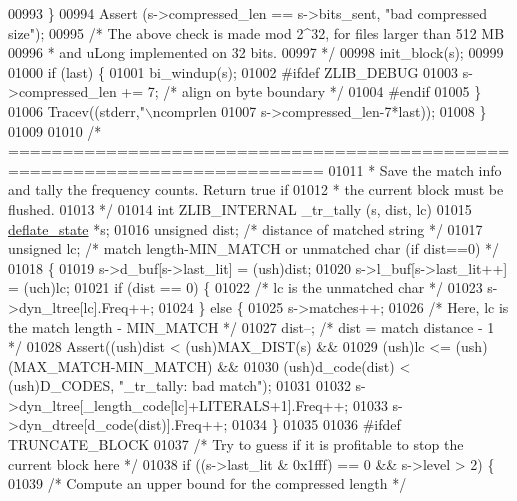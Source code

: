 \begin{DoxyCode}
{{{{{{{{{{{{{{{{{{{{{00993     \}
00994     Assert (s->compressed\_len == s->bits\_sent, \textcolor{stringliteral}{"bad compressed size"});
00995     \textcolor{comment}{/* The above check is made mod 2^32, for files larger than 512 MB}
00996 \textcolor{comment}{     * and uLong implemented on 32 bits.}
00997 \textcolor{comment}{     */}
00998     init\_block(s);
00999 
01000     \textcolor{keywordflow}{if} (last) \{
01001         bi\_windup(s);
01002 \textcolor{preprocessor}{#ifdef ZLIB\_DEBUG}
01003         s->compressed\_len += 7;  \textcolor{comment}{/* align on byte boundary */}
01004 \textcolor{preprocessor}{#endif}
01005     \}
01006     Tracev((stderr,\textcolor{stringliteral}{"\(\backslash\)ncomprlen %
01007            s->compressed\_len-7*last));
01008 \}
01009 
01010 \textcolor{comment}{/* ===========================================================================}
01011 \textcolor{comment}{ * Save the match info and tally the frequency counts. Return true if}
01012 \textcolor{comment}{ * the current block must be flushed.}
01013 \textcolor{comment}{ */}
01014 \textcolor{keywordtype}{int} ZLIB\_INTERNAL \_tr\_tally (s, dist, lc)
01015     \hyperlink{structinternal__state}{deflate\_state} *s;
01016     \textcolor{keywordtype}{unsigned} dist;  \textcolor{comment}{/* distance of matched string */}
01017     \textcolor{keywordtype}{unsigned} lc;    \textcolor{comment}{/* match length-MIN\_MATCH or unmatched char (if dist==0) */}
01018 \{
01019     s->d\_buf[s->last\_lit] = (ush)dist;
01020     s->l\_buf[s->last\_lit++] = (uch)lc;
01021     \textcolor{keywordflow}{if} (dist == 0) \{
01022         \textcolor{comment}{/* lc is the unmatched char */}
01023         s->dyn\_ltree[lc].Freq++;
01024     \} \textcolor{keywordflow}{else} \{
01025         s->matches++;
01026         \textcolor{comment}{/* Here, lc is the match length - MIN\_MATCH */}
01027         dist--;             \textcolor{comment}{/* dist = match distance - 1 */}
01028         Assert((ush)dist < (ush)MAX\_DIST(s) &&
01029                (ush)lc <= (ush)(MAX\_MATCH-MIN\_MATCH) &&
01030                (ush)d\_code(dist) < (ush)D\_CODES,  \textcolor{stringliteral}{"\_tr\_tally: bad match"});
01031 
01032         s->dyn\_ltree[\_length\_code[lc]+LITERALS+1].Freq++;
01033         s->dyn\_dtree[d\_code(dist)].Freq++;
01034     \}
01035 
01036 \textcolor{preprocessor}{#ifdef TRUNCATE\_BLOCK}
01037     \textcolor{comment}{/* Try to guess if it is profitable to stop the current block here */}
01038     \textcolor{keywordflow}{if} ((s->last\_lit & 0x1fff) == 0 && s->level > 2) \{
01039         \textcolor{comment}{/* Compute an upper bound for the compressed length */}
}}}}}}}}}}}}}}}}}}}}}}
\end{DoxyCode}
